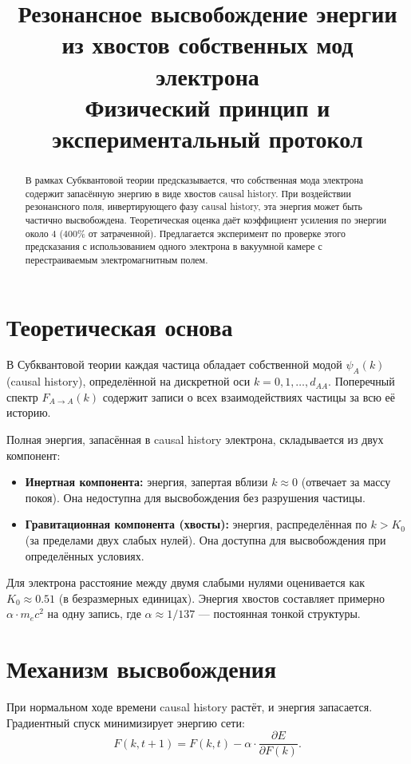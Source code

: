 \documentclass[12pt,a4paper]{article}
\title{\textbf{Резонансное высвобождение энергии из хвостов собственных мод электрона}\\
\large Физический принцип и экспериментальный протокол}
\author{}
\date{}
\begin{document}
\maketitle

\begin{abstract}
В рамках Субквантовой теории предсказывается, что собственная мода электрона содержит запасённую энергию в виде хвостов causal history. При воздействии резонансного поля, инвертирующего фазу causal history, эта энергия может быть частично высвобождена. Теоретическая оценка даёт коэффициент усиления по энергии около $4$ ($400\%$ от затраченной). Предлагается эксперимент по проверке этого предсказания с использованием одного электрона в вакуумной камере с перестраиваемым электромагнитным полем.
\end{abstract}

\section{Теоретическая основа}
В Субквантовой теории каждая частица обладает собственной модой $\psi_A(k)$ (causal history), определённой на дискретной оси $k = 0, 1, \dots, d_{AA}$. Поперечный спектр $F_{A \to A}(k)$ содержит записи о всех взаимодействиях частицы за всю её историю.

Полная энергия, запасённая в causal history электрона, складывается из двух компонент:
\begin{itemize}
    \item \textbf{Инертная компонента:} энергия, запертая вблизи $k \approx 0$ (отвечает за массу покоя). Она недоступна для высвобождения без разрушения частицы.
    \item \textbf{Гравитационная компонента (хвосты):} энергия, распределённая по $k > K_0$ (за пределами двух слабых нулей). Она доступна для высвобождения при определённых условиях.
\end{itemize}

Для электрона расстояние между двумя слабыми нулями оценивается как $K_0 \approx 0.51$ (в безразмерных единицах). Энергия хвостов составляет примерно $\alpha \cdot m_e c^2$ на одну запись, где $\alpha \approx 1/137$ --- постоянная тонкой структуры.

\section{Механизм высвобождения}
При нормальном ходе времени causal history растёт, и энергия запасается. Градиентный спуск минимизирует энергию сети:
\begin{equation}
    F(k, t+1) = F(k, t) - \alpha \cdot \frac{\partial E}{\partial F(k)}.
\end{equation}
\end{document}
